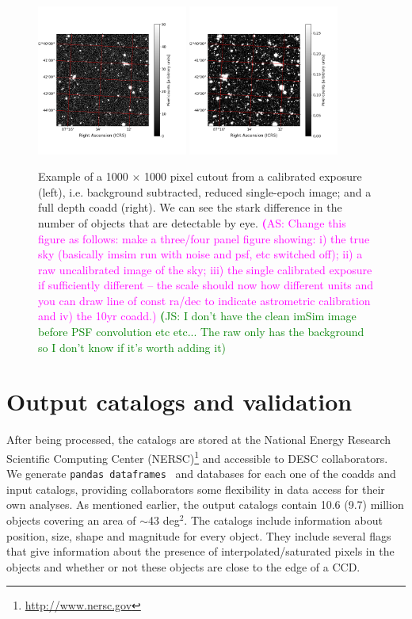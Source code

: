 \documentclass[twocolumn]{aastex62}
\newcommand{\as}[1]{{\textcolor{magenta}{{\textbf (AS: #1)}}}}
\newcommand{\js}[1]{{\textcolor{green}{{\textbf (JS: #1)}}}}
\begin{document}
\begin{figure}
\centering
\includegraphics[width=0.44\textwidth]{calexp_example.png}
\includegraphics[width=0.44\textwidth]{coadd_example.png}
\caption{Example of a 1000 $\times$ 1000 pixel cutout from a calibrated exposure (left), i.e. background subtracted, reduced single-epoch image; and a full depth coadd (right). We can see the stark difference in the number of objects that are detectable by eye.
\as{Change this figure as follows: make a three/four panel figure showing: i) the true sky (basically imsim run with noise and psf, etc switched off); ii) a raw uncalibrated image of the sky; iii) the single calibrated exposure if sufficiently different -- the scale should now how different units and you can draw line of const ra/dec to indicate astrometric calibration and iv) the 10yr coadd.} \js{I don't have the clean imSim image before PSF convolution etc etc... The raw only has the background so I don't know if it's worth adding it}}
\label{fig:coadd_example}
\end{figure}

\section{Output catalogs and validation}
\label{sec:catalogs}
After being processed, the catalogs are stored at the National Energy Research Scientific Computing Center (NERSC)\footnote{\url{http://www.nersc.gov}} and accessible to DESC collaborators. We generate \texttt{pandas
dataframes}~\citep{mckinney-proc-scipy-2010} and databases for each one of the coadds and input catalogs, providing collaborators some flexibility in data access for their own analyses. As mentioned earlier, the output catalogs contain 10.6 (9.7) million objects covering an area
of $\sim$43 deg$^{2}$. The catalogs include information about position, size, shape and magnitude for every object. They include several flags that give information about the presence of interpolated/saturated pixels in the objects and whether or not these objects are close to the edge of a CCD.
\end{document}
